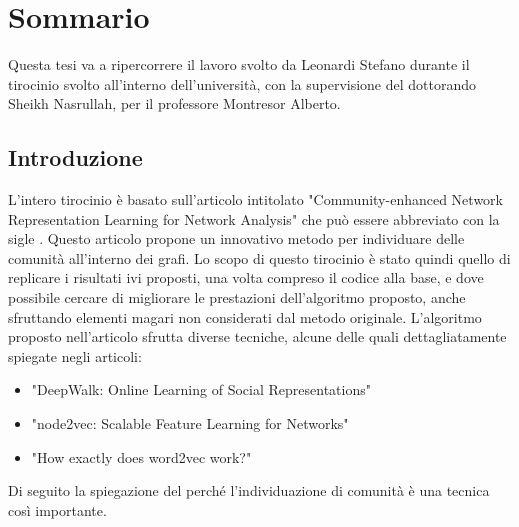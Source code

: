 %
%
%
\chapter{Sommario}
Questa tesi va a ripercorrere il lavoro svolto da Leonardi Stefano durante il tirocinio svolto all'interno dell'università, con la supervisione del dottorando Sheikh Nasrullah, per il professore Montresor Alberto.
%
\section{Introduzione}
L'intero tirocinio è basato sull'articolo intitolato "Community-enhanced Network Representation Learning for Network Analysis" che può essere abbreviato con la sigle \cnrl. Questo articolo propone un innovativo metodo per individuare delle comunità all'interno dei grafi. Lo scopo di questo tirocinio è stato quindi quello di replicare i risultati ivi proposti, una volta compreso il codice alla base, e dove possibile cercare di migliorare le prestazioni dell'algoritmo proposto, anche sfruttando elementi magari non considerati dal metodo originale.\newline
L'algoritmo proposto nell'articolo sfrutta diverse tecniche, alcune delle quali dettagliatamente spiegate negli articoli:
\begin{itemize}
	\item "DeepWalk: Online Learning of Social Representations"
	\item "node2vec: Scalable Feature Learning for Networks"
	\item "How exactly does word2vec work?"
\end{itemize} 
Di seguito la spiegazione del perché l'individuazione di comunità è una tecnica così importante.
%
